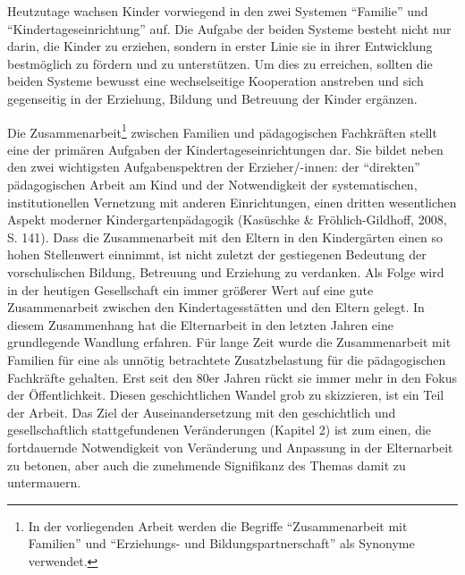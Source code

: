 \documentclass[12pt,a4paper]{article}
\begin{document}
 
\noindent Heutzutage wachsen Kinder vorwiegend in den zwei Systemen "`Familie"' und "`Kindertageseinrichtung"' auf. Die Aufgabe der beiden Systeme besteht nicht nur darin, die Kinder zu erziehen, sondern in erster Linie sie in ihrer Entwicklung bestmöglich zu fördern und zu unterstützen. Um dies zu erreichen, sollten die beiden Systeme bewusst eine wechselseitige Kooperation anstreben und sich gegenseitig in der Erziehung, Bildung und Betreuung der Kinder ergänzen.
	  
Die Zusammenarbeit\footnote{In der vorliegenden Arbeit werden die Begriffe "`Zusammenarbeit mit Familien"' und "`Erziehungs- und Bildungspartnerschaft"' als Synonyme verwendet.} zwischen Familien und pä\-da\-go\-gisch\-en Fach\-kräf\-ten stellt eine der primären Aufgaben der Kindertageseinrichtungen dar. Sie bildet neben den zwei wichtigsten Aufgabenspektren der Erzieher/-innen: der "`direkten"' pä\-da\-go\-gisch\-en Arbeit am Kind und der Notwendigkeit der systematischen, institutionellen Vernetzung mit anderen Einrichtungen, einen dritten wesentlichen Aspekt moderner Kindergartenpädagogik (Kasüschke \& Fröhlich-Gildhoff, 2008, S. 141). Dass die Zusammenarbeit mit den Eltern in den Kindergärten einen so hohen Stellenwert einnimmt, ist nicht zuletzt der gestiegenen Bedeutung der vorschulischen Bildung, Betreuung und Erziehung zu verdanken. Als Folge wird in der heutigen Gesellschaft ein immer größerer Wert auf eine gute Zusammenarbeit zwischen den Kindertagesstätten und den Eltern gelegt. In diesem Zusammenhang hat die Elternarbeit in den letzten Jahren eine grundlegende Wandlung erfahren. Für lange Zeit wurde die Zusammenarbeit mit Familien für eine als unnötig betrachtete Zusatzbelastung für die pädagogischen Fachkräfte gehalten. Erst seit den 80er Jahren rückt sie immer mehr in den Fokus der Öffentlichkeit. Diesen geschichtlichen Wandel grob zu skizzieren, ist ein Teil der Arbeit. Das Ziel der Auseinandersetzung mit den geschichtlich und gesellschaftlich stattgefundenen Veränderungen (Kapitel 2) ist zum einen, die fortdauernde Notwendigkeit von Veränderung und Anpassung in der Elternarbeit zu betonen, aber auch die zunehmende Signifikanz des Themas damit zu untermauern.
\end{document}
